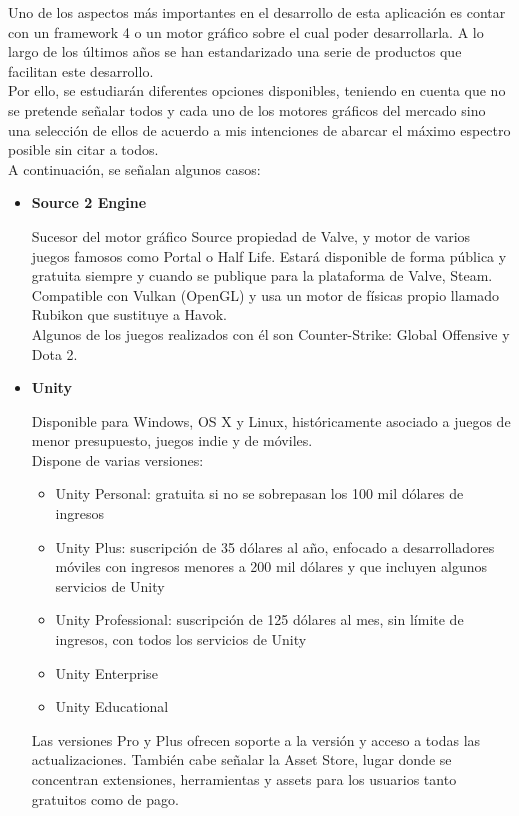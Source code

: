 \quad Uno de los aspectos más importantes en el desarrollo de esta aplicación es contar con un framework 4 o un motor gráfico sobre el cual poder desarrollarla. A lo largo de
los últimos años se han estandarizado una serie de productos que facilitan este desarrollo.\\

\quad Por ello, se estudiarán diferentes opciones disponibles, teniendo en cuenta que no se pretende señalar todos y cada uno de los motores gráficos del mercado sino una
selección de ellos de acuerdo a mis intenciones de abarcar el máximo espectro posible sin citar a todos.\\

\quad A continuación, se señalan algunos casos:

\begin{itemize}
\item{\textbf{Source 2 Engine}}

\quad Sucesor del motor gráfico Source propiedad de Valve, y motor de varios juegos famosos como Portal o Half Life. Estará disponible de forma pública y gratuita siempre y cuando se publique para la plataforma de Valve, Steam. Compatible con Vulkan (OpenGL) y usa un motor de físicas propio llamado Rubikon que sustituye a Havok. \\

\quad Algunos de los juegos realizados con él son Counter-Strike: Global Offensive y Dota 2.\\

\item{\textbf{Unity}}

\quad Disponible para Windows, OS X y Linux, históricamente asociado a juegos de menor presupuesto, juegos indie y de móviles.\\

\quad Dispone de varias versiones:
\begin{itemize}
	\item Unity Personal: gratuita si no se sobrepasan los 100 mil dólares de ingresos
	\item Unity Plus: suscripción de 35 dólares al año, enfocado a desarrolladores móviles con ingresos menores a 200 mil dólares y que incluyen algunos servicios de Unity
	\item Unity Professional: suscripción de 125 dólares al mes, sin límite de ingresos, con todos los servicios de Unity
	\item Unity Enterprise
	\item Unity Educational
\end{itemize}
\quad Las versiones Pro y Plus ofrecen soporte a la versión y acceso a todas las actualizaciones. También cabe señalar la Asset Store, lugar donde se concentran extensiones, herramientas y assets para los usuarios tanto gratuitos como de pago.\\


\end{itemize}
